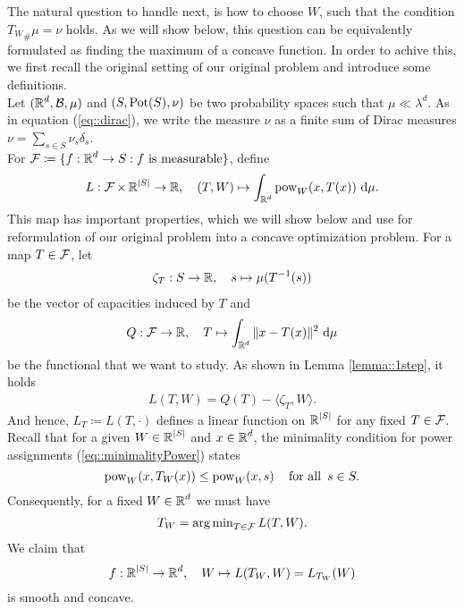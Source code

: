 \documentclass[
     12pt,         %
     a4paper,      %
     BCOR=10mm,     %
     DIV=14,        %
     ]{scrreprt}
\begin{document}
    The natural question to handle next, is how to choose $W$, such that the condition ${T_{W}}_{\#}\mu = \nu$ holds. As we will show below, this question can be equivalently formulated
    as finding the maximum of a concave function. In order to achive this, we first recall the original setting of our original problem and introduce some definitions. \\[8pt]
    \indent Let $(\operatorname{\mathbb{R}}^d, \operatorname{\mathcal{B}}, \mu)$ and $(S, \operatorname{Pot}(S), \nu)$ be two probability spaces such that $\mu \ll \lambda^d$. As in equation (\ref{eq::dirac}), we write the measure $\nu$ as 
    a finite sum of Dirac measures $\nu = \sum_{s\in S} {\nu_s \delta_{s}} $. \\
    For $\operatorname{\mathcal{F}} \coloneqq \{ f: \operatorname{\mathbb{R}}^d \to S : f \text{ is measurable}\}$, define
    \[L: \operatorname{\mathcal{F}} \times \operatorname{\mathbb{R}}^{|S|} \to \operatorname{\mathbb{R}}, \quad (T,W) \mapsto \int_{\operatorname{\mathbb{R}}^d} \operatorname{pow}_W(x,T(x)) \ {\operatorname{{\mathrm{d}}}} \mu. \]
    This map has important properties, which we will show below and use for reformulation of our original problem into a concave optimization problem. For a map $T\in \operatorname{\mathcal{F}}$, let 
    \begin{align} \label{eq::defzeta}
         \zeta_T : S \to \operatorname{\mathbb{R}}, \quad s\mapsto \mu(T^{-1}(s))
    \end{align}
    be the vector of capacities induced by $T$ and 
    \[Q: \operatorname{\mathcal{F}} \to \operatorname{\mathbb{R}}, \quad T \mapsto \int_{\operatorname{\mathbb{R}}^d} \|x-T(x)\|^2 \ {\operatorname{{\mathrm{d}}}} \mu \]
    be the functional that we want to study. As shown in Lemma \ref{lemma::1step}, it holds
    \begin{align} \label{eq::defL}
        L(T,W) = Q(T) - \langle \zeta_T, W \rangle.
    \end{align}
    And hence, $L_T \coloneqq L(T, \cdot)$ defines a linear function on $\operatorname{\mathbb{R}}^{|S|}$ for any fixed $T \in \operatorname{\mathcal{F}}$. \\[8pt]
    \indent Recall that for a given $W \in \operatorname{\mathbb{R}}^{|S|}$ and $x\in \operatorname{\mathbb{R}}^d$, the minimality condition for power assignments (\ref{eq::minimalityPower}) states
    \[\pow_W(x,T_W(x)) \le \pow_W(x,s) \quad \forAll s \in S.\]
    Consequently, for a fixed $W \in \operatorname{\mathbb{R}}^d$ we must have 
    \begin{align} \label{eq:propTW}
        T_W = \operatorname{arg\,min}_{T\in \operatorname{\mathcal{F}}} L(T,W).
    \end{align}
    We claim that \[ f : \operatorname{\mathbb{R}}^{|S|} \to \operatorname{\mathbb{R}}^d, \quad W \mapsto L(T_W, W) = L_{T_W}(W) \]
    is smooth and concave.
\end{document}
